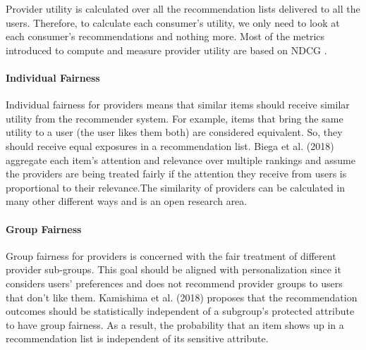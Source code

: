             Provider utility is calculated over all the recommendation lists delivered to all the users. Therefore, to calculate each consumer's utility, we only need to look at each consumer's recommendations and nothing more. Most of the metrics introduced to compute and measure provider utility are based on NDCG \cite{biega2018equity}. %
            
            \vspace{0.25cm}
            \noindent \paragraph{Individual Fairness}
            \vspace{0.25cm}
            
                Individual fairness for providers means that similar items should receive similar utility from the recommender system. For example, items that bring the same utility to a user (the user likes them both) are considered equivalent. So, they should receive equal exposures in a recommendation list. Biega et al. (2018) \cite{biega2018equity} aggregate each item's attention and relevance over multiple rankings and assume the providers are being treated fairly if the attention they receive from users is proportional to their relevance.The similarity of providers can be calculated in many other different ways and is an open research area.
                
            \vspace{0.25cm}
            \noindent \paragraph{Group Fairness}
            \vspace{0.25cm}
            
                Group fairness for providers is concerned with the fair treatment of different provider sub-groups. This goal should be aligned with personalization since it considers users' preferences and does not recommend provider groups to users that don't like them. Kamishima et al. (2018) \cite{kamishima2018recommendation} proposes that the recommendation outcomes should be statistically independent of a subgroup's protected attribute to have group fairness. As a result, the probability that an item shows up in a recommendation list is independent of its sensitive attribute.
                
